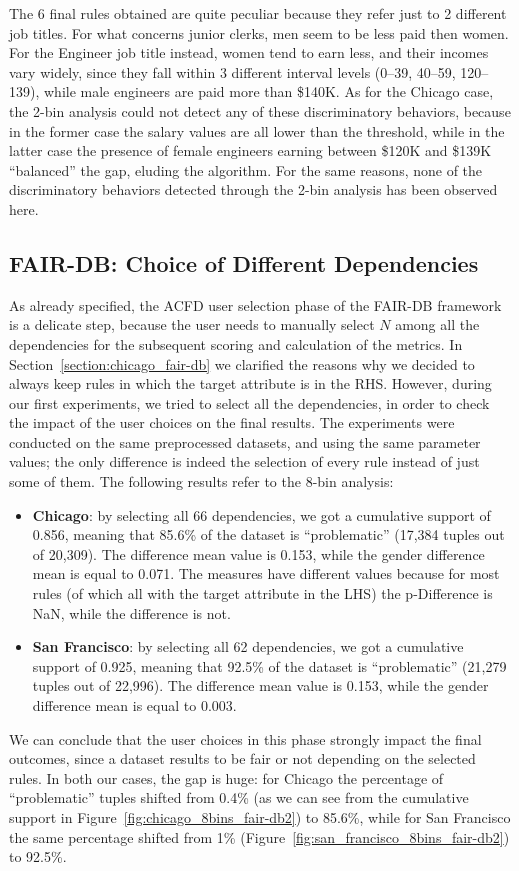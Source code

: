 \begin{itemize}
The 6 final rules obtained are quite peculiar because they refer just to 2 different job titles. For what concerns junior clerks, men seem to be less paid then women. For the Engineer job title instead, women tend to earn less, and their incomes vary widely, since they fall within 3 different interval levels (0--39, 40--59, 120--139), while male engineers are paid more than \$140K. As for the Chicago case, the 2-bin analysis could not detect any of these discriminatory behaviors, because in the former case the salary values are all lower than the threshold, while in the latter case the presence of female engineers earning between \$120K and \$139K ``balanced'' the gap, eluding the algorithm. For the same reasons, none of the discriminatory behaviors detected through the 2-bin analysis has been observed here.
\end{itemize} 


\subsection{FAIR-DB: Choice of Different Dependencies}
As already specified, the ACFD user selection phase of the FAIR-DB framework is a delicate step, because the user needs to manually select \(N\) among all the dependencies for the subsequent scoring and calculation of the metrics. In Section~\ref{section:chicago_fair-db} we clarified the reasons why we decided to always keep rules in which the target attribute is in the RHS. However, during our first experiments, we tried to select all the dependencies, in order to check the impact of the user choices on the final results. The experiments were conducted on the same preprocessed datasets, and using the same parameter values; the only difference is indeed the selection of every rule instead of just some of them. The following results refer to the 8-bin analysis:
\begin{itemize}
\item \textbf{Chicago}: by selecting all 66 dependencies, we got a cumulative support of 0.856, meaning that 85.6\% of the dataset is ``problematic'' (17,384 tuples out of 20,309). The difference mean value is 0.153, while the gender difference mean is equal to 0.071. The measures have different values because for most rules (of which all with the target attribute in the LHS) the p-Difference is NaN, while the difference is not.
\item \textbf{San Francisco}: by selecting all 62 dependencies, we got a cumulative support of 0.925, meaning that 92.5\% of the dataset is ``problematic'' (21,279 tuples out of 22,996). The difference mean value is 0.153, while the gender difference mean is equal to 0.003.
\end{itemize}
We can conclude that the user choices in this phase strongly impact the final outcomes, since a dataset results to be fair or not depending on the selected rules. In both our cases, the gap is huge: for Chicago the percentage of ``problematic'' tuples shifted from 0.4\% (as we can see from the cumulative support in Figure~\ref{fig:chicago_8bins_fair-db2}) to 85.6\%, while for San Francisco the same percentage shifted from 1\% (Figure~\ref{fig:san_francisco_8bins_fair-db2}) to 92.5\%.


